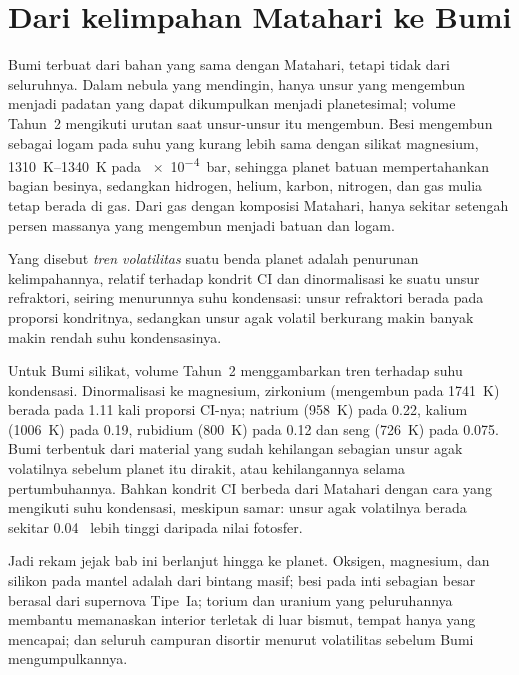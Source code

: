 \section{Dari kelimpahan Matahari ke Bumi}\label{sec:b3:origin-of-elements:earth}

Bumi terbuat dari bahan yang sama dengan Matahari, tetapi tidak dari seluruhnya.
Dalam nebula yang mendingin, hanya unsur yang mengembun menjadi padatan
yang dapat dikumpulkan menjadi planetesimal; volume Tahun~2 mengikuti
urutan saat unsur-unsur itu mengembun. Besi mengembun sebagai logam pada suhu yang kurang lebih
sama dengan silikat magnesium, \qtyrange{1310}{1340}{K} pada
\qty{e-4}{bar}, sehingga planet batuan mempertahankan bagian besinya, sedangkan
hidrogen, helium, karbon, nitrogen, dan gas mulia tetap berada di gas.
Dari gas dengan komposisi Matahari, hanya sekitar setengah persen massanya
yang mengembun menjadi batuan dan logam.

\begin{definition}\label{def:b3:origin-of-elements:volatility}
Yang disebut \emph{tren volatilitas} suatu benda planet
adalah penurunan kelimpahannya, relatif terhadap kondrit CI dan
dinormalisasi ke suatu unsur refraktori, seiring menurunnya suhu kondensasi:
unsur refraktori berada pada proporsi kondritnya, sedangkan unsur agak volatil
berkurang makin banyak makin rendah
suhu kondensasinya.
\end{definition}

Untuk Bumi silikat, volume Tahun~2 menggambarkan tren terhadap
suhu kondensasi. Dinormalisasi ke magnesium, zirkonium
(mengembun pada \qty{1741}{K}) berada pada \num{1.11} kali
proporsi CI-nya; natrium (\qty{958}{K}) pada \num{0.22}, kalium
(\qty{1006}{K}) pada \num{0.19}, rubidium (\qty{800}{K}) pada \num{0.12}
dan seng (\qty{726}{K}) pada \num{0.075}. Bumi terbentuk dari material
yang sudah kehilangan sebagian unsur agak volatilnya sebelum
planet itu dirakit, atau kehilangannya selama pertumbuhannya. Bahkan kondrit CI
berbeda dari Matahari dengan cara yang mengikuti suhu kondensasi,
meskipun samar: unsur agak volatilnya berada
sekitar \num{0.04}~ lebih tinggi daripada nilai fotosfer.

Jadi rekam jejak bab ini berlanjut hingga ke planet. Oksigen,
magnesium, dan silikon pada mantel adalah  dari bintang masif;
besi pada inti sebagian besar berasal dari supernova Tipe~Ia;
torium dan uranium yang peluruhannya membantu memanaskan interior terletak di luar
bismut, tempat hanya  yang mencapai; dan seluruh campuran
disortir menurut volatilitas sebelum Bumi mengumpulkannya.

